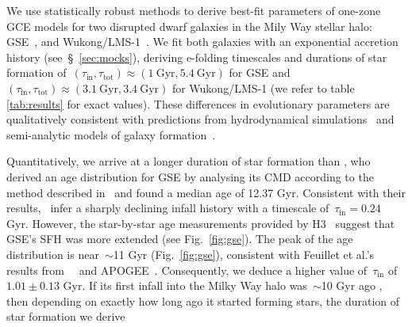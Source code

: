 We use statistically robust methods to derive best-fit parameters of
one-zone GCE models for two disrupted dwarf galaxies in the Mily Way stellar
halo: GSE~\citep{Belokurov2018, Helmi2018}, and Wukong/LMS-1~\citep{Naidu2020,
Naidu2022, Yuan2020}.
We fit both galaxies with an exponential accretion history
(see~\S~\ref{sec:mocks}), deriving e-folding timescales and durations of star
formation of~$(\tau_\text{in}, \tau_\text{tot}) \approx (1~\text{Gyr},
5.4~\text{Gyr})$ for GSE and~$(\tau_\text{in}, \tau_\text{tot}) \approx
(3.1~\text{Gyr}, 3.4~\text{Gyr})$ for Wukong/LMS-1 (we refer to table
\ref{tab:results} for exact values).
These differences in evolutionary parameters are qualitatively consistent with
predictions from hydrodynamical simulations~\citep[e.g.,][]{GarrisonKimmel2019}
and semi-analytic models of galaxy formation~\citep[e.g.,][]{Baugh2006,
Somerville2015a, Behroozi2019}.
\par
Quantitatively, we arrive at a longer duration of star formation than
\citet{Gallart2019}, who derived an age distribution for GSE by analysing its
CMD according to the method described in~\citet{Dolphin2002} and found a
median age of 12.37 Gyr.
Consistent with their results,~\citet{Vincenzo2019b} infer a sharply declining
infall history with a timescale of~$\tau_\text{in} = 0.24$ Gyr.
However, the star-by-star age measurements provided by H3~\citep{Conroy2019}
suggest that GSE's SFH was more extended (see Fig.~\ref{fig:gse}).
The peak of the age distribution is near~$\sim$11 Gyr (Fig.~\ref{fig:gse}),
consistent with Feuillet et al.'s~\citeyearpar{Feuillet2021} results
from~\gaia~\citep{GaiaCollaboration2016} and APOGEE~\citep{Majewski2017}.
Consequently, we deduce a higher value of~$\tau_\text{in}$ of~$1.01 \pm 0.13$
Gyr.
If its first infall into the Milky Way halo was~$\sim$10 Gyr ago
\citep[e.g.,][]{Helmi2018, Bonaca2020}, then depending on exactly how long ago
it started forming stars, the duration of star formation we derive

